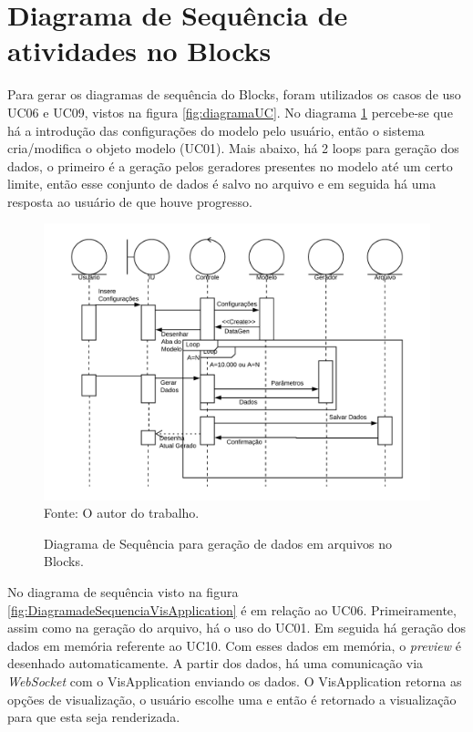 \documentclass[
	12pt,				%
	openright,			%
	oneside,			%
	a4paper,			%
	english,			%
	brazil				%
	]{abntex2}
\begin{document}
	\section{Diagrama de Sequência de atividades no Blocks}
	Para gerar os diagramas de sequência do Blocks, foram utilizados os casos de uso UC06 e UC09, vistos na figura \ref{fig:diagramaUC}.
	No diagrama \ref{fig:DiagramadeSequenciaArquivo} percebe-se que há a introdução das configurações do modelo pelo usuário, então o sistema cria/modifica o objeto modelo (UC01).
	Mais abaixo, há 2 loops para geração dos dados, o primeiro é a geração pelos geradores presentes no modelo até um certo limite, então esse conjunto de dados é salvo no arquivo e em seguida há uma resposta ao usuário de que houve progresso.
	\begin{figure}[h!]
		\centering
		\caption{Diagrama de Sequência para geração de dados em arquivos no Blocks.}
		\includegraphics[width=\linewidth]{./figures/prototipo/DiagramadeSequenciaArquivo.png}
		\label{fig:DiagramadeSequenciaArquivo}
		\footnotesize Fonte: O autor do trabalho.
	\end{figure}
	\par
	No diagrama de sequência visto na figura \ref{fig:DiagramadeSequenciaVisApplication} é em relação ao UC06.
	Primeiramente, assim como na geração do arquivo, há o uso do UC01.
	Em seguida há geração dos dados em memória referente ao UC10.
	Com esses dados em memória, o \emph{preview} é desenhado automaticamente.
	A partir dos dados, há uma comunicação via \emph{WebSocket} com o VisApplication enviando os dados.
	O VisApplication retorna as opções de visualização, o usuário escolhe uma e então é retornado a visualização para que esta seja renderizada.
\end{document}
